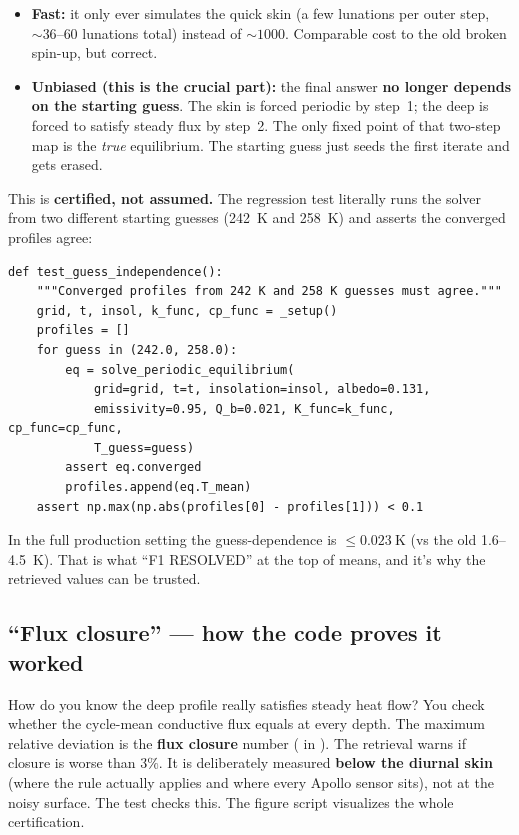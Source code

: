 \begin{itemize}[leftmargin=1.4em,itemsep=3pt]
  \item \textbf{Fast:} it only ever simulates the quick skin (a few lunations per
    outer step, ${\sim}36$--$60$ lunations total) instead of ${\sim}1000$.
    Comparable cost to the old broken spin-up, but correct.
  \item \textbf{Unbiased (this is the crucial part):} the final answer \textbf{no
    longer depends on the starting guess}. The skin is forced periodic by step~1;
    the deep is forced to satisfy steady flux by step~2. The only fixed point of
    that two-step map is the \emph{true} equilibrium. The starting guess just
    seeds the first iterate and gets erased.
\end{itemize}

This is \textbf{certified, not assumed.} The regression test
 literally runs the
solver from two different starting guesses (\SI{242}{\kelvin} and
\SI{258}{\kelvin}) and asserts the converged profiles agree:

\begin{lstlisting}[caption={The guess-independence regression test.}]
def test_guess_independence():
    """Converged profiles from 242 K and 258 K guesses must agree."""
    grid, t, insol, k_func, cp_func = _setup()
    profiles = []
    for guess in (242.0, 258.0):
        eq = solve_periodic_equilibrium(
            grid=grid, t=t, insolation=insol, albedo=0.131,
            emissivity=0.95, Q_b=0.021, K_func=k_func, cp_func=cp_func,
            T_guess=guess)
        assert eq.converged
        profiles.append(eq.T_mean)
    assert np.max(np.abs(profiles[0] - profiles[1])) < 0.1
\end{lstlisting}

In the full production setting the guess-dependence is $\le \SI{0.023}{\kelvin}$
(vs the old \SI{1.6}{}--\SI{4.5}{\kelvin}). That is what ``F1 RESOLVED'' at the
top of  means, and it's why the retrieved \Kdstar{}
values can be trusted.

\subsection{``Flux closure'' --- how the code proves it worked}

How do you know the deep profile really satisfies steady heat flow? You check
whether the cycle-mean conductive flux equals \Qb{} at every depth. The maximum
relative deviation is the \textbf{flux closure} number ( in
). The retrieval warns if closure is worse than $3\%$. It
is deliberately measured \textbf{below the diurnal skin} (where the rule actually
applies and where every Apollo sensor sits), not at the noisy surface. The test
 checks this. The
 figure script visualizes the whole
certification.
